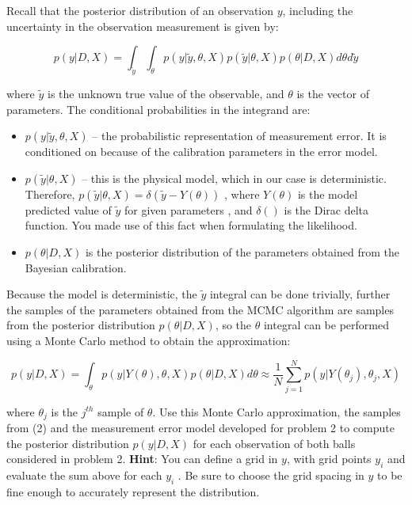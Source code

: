 \documentclass{article}
\begin{document}
Recall that the posterior distribution of an observation $y$, including
the uncertainty in the observation measurement is given by:

\begin{equation}
p\left(y|D,X\right)=\int_{\tilde{y}}\int_{\theta}p\left(y|\tilde{y},\theta,X\right)p\left(\tilde{y}|\theta,X\right)p\left(\theta|D,X\right)d\theta d\tilde{y}
\end{equation}


where $\tilde{y}$ is the unknown true value of the observable, and
$\theta$ is the vector of parameters. The conditional probabilities
in the integrand are:
\begin{itemize}
\item $p\left(y|\tilde{y},\theta,X\right)$ -- the probabilistic representation
of measurement error. It is conditioned on because of the calibration
parameters in the error model.
\item $p\left(\tilde{y}|\theta,X\right)$ -- this is the physical model,
which in our case is deterministic. Therefore, $p\left(\tilde{y}|\theta,X\right)=\delta\left(\tilde{y}-Y\left(\theta\right)\right)$
, where $Y\left(\theta\right)$ is the model predicted value of $\tilde{y}$
for given parameters , and $\delta\left(\right)$ is the Dirac delta
function. You made use of this fact when formulating the likelihood.
\item $p\left(\theta|D,X\right)$ is the posterior distribution of the parameters
obtained from the Bayesian calibration.
\end{itemize}
Because the model is deterministic, the $\tilde{y}$ integral can
be done trivially, further the samples of the parameters obtained
from the MCMC algorithm are samples from the posterior distribution
$p\left(\theta|D,X\right)$, so the $\theta$ integral can be performed
using a Monte Carlo method to obtain the approximation:

\begin{equation}
p\left(y|D,X\right)=\int_{\theta}p\left(y|Y\left(\theta\right),\theta,X\right)p\left(\theta|D,X\right)d\theta\approx\frac{1}{N}\sum_{j=1}^{N}p\left(y|Y\left(\theta_{j}\right),\theta_{j},X\right)
\end{equation}


where $\theta_{j}$ is the $j^{th}$ sample of $\theta$. Use this
Monte Carlo approximation, the samples from (2) and the measurement
error model developed for problem 2 to compute the posterior distribution
$p\left(y|D,X\right)$ for each observation of both balls considered
in problem 2. \textbf{Hint}: You can define a grid in $y$, with grid
points $y_{i}$ and evaluate the sum above for each $y_{i}$ . Be
sure to choose the grid spacing in $y$ to be fine enough to accurately
represent the distribution.
\end{document}
